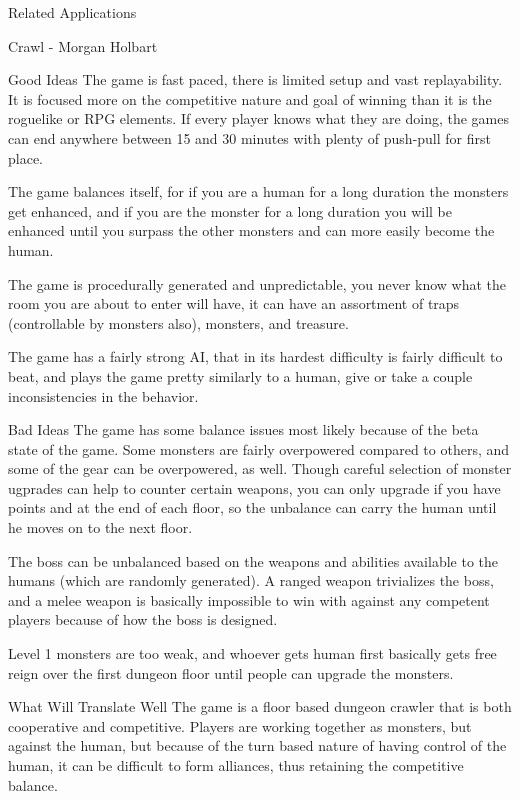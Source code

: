 \documentclass[12pt]{report}
\begin{document}
\begin{section}{Related Applications}
\begin{subsection}{Crawl - Morgan Holbart}
\begin{subsubsection}{Good Ideas}
The game is fast paced, there is limited setup and vast replayability. It
is focused more on the competitive nature and goal of winning than it is
the roguelike or RPG elements. If every player knows what they are doing,
the games can end anywhere between 15 and 30 minutes with plenty of
push-pull for first place.

The game balances itself, for if you are a human for a long duration the
monsters get enhanced, and if you are the monster for a long duration you
will be enhanced until you surpass the other monsters and can more easily
become the human.

The game is procedurally generated and unpredictable, you never know what
the room you are about to enter will have, it can have an assortment of
traps (controllable by monsters also), monsters, and treasure.

The game has a fairly strong AI, that in its hardest difficulty is fairly
difficult to beat, and plays the game pretty similarly to a human, give or
take a couple inconsistencies in the behavior.
\end{subsubsection}

\begin{subsubsection}{Bad Ideas}
The game has some balance issues most likely because of the beta state of
the game. Some monsters are fairly  overpowered compared to others, and
some of the gear can be overpowered, as well. Though careful selection of
monster ugprades can help to counter certain weapons, you can only upgrade
if you have points and at the end of each floor, so the unbalance can
carry the human until he moves on to the next floor.

The boss can be unbalanced based on the weapons and abilities available to
the humans (which are randomly generated). A ranged weapon trivializes the
boss, and a melee weapon is basically impossible to win with against any
competent players because of how the boss is designed.

Level 1 monsters are too weak, and whoever gets human first basically gets
free reign over the first dungeon floor until people can upgrade the
monsters.
\end{subsubsection}

\begin{subsubsection}{What Will Translate Well}
The game is a floor based dungeon crawler that is both cooperative and
competitive. Players are working together as monsters, but against the
human, but because of the turn based nature of having control of the human,
it can be difficult to form alliances, thus retaining the competitive
balance. 


\end{subsubsection}
\end{subsection}
\end{section}
\end{document}
